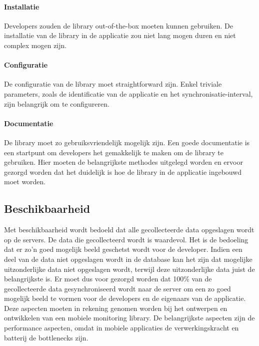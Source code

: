 \paragraph{Installatie} Developers zouden de library out-of-the-box moeten kunnen gebruiken. De installatie van de library in de applicatie zou niet lang mogen duren en niet complex mogen zijn. \\

\paragraph{Configuratie} De configuratie van de library moet straightforward zijn. Enkel triviale parameters, zoals de identificatie van de applicatie en het synchronisatie-interval, zijn belangrijk om te configureren. \\

\paragraph{Documentatie} De library moet zo gebruiksvriendelijk mogelijk zijn. Een goede documentatie is een startpunt om developers het gemakkelijk te maken om de library te gebruiken. Hier moeten de belangrijkste methodes uitgelegd worden en ervoor gezorgd worden dat het duidelijk is hoe de library in de applicatie ingebouwd moet worden. 



\subsection{Beschikbaarheid}
Met beschikbaarheid wordt bedoeld dat alle gecollecteerde data opgeslagen wordt op de servers. De data die gecollecteerd wordt is waardevol. Het is de bedoeling dat er zo'n goed mogelijk beeld geschetst wordt voor de developer. Indien een deel van de data niet opgeslagen wordt in de database kan het zijn dat mogelijke uitzonderlijke data niet opgeslagen wordt, terwijl deze uitzonderlijke data juist de belangrijkste is. Er moet dus voor gezorgd worden dat 100\% van de gecollecteerde data gesynchroniseerd wordt naar de server om een zo goed mogelijk beeld te vormen voor de developers en de eigenaars van de applicatie.\\


Deze aspecten moeten in rekening genomen worden bij het ontwerpen en ontwikkelen van een mobiele monitoring library. De belangrijkste aspecten zijn de performance aspecten, omdat in mobiele applicaties de verwerkingskracht en batterij de bottlenecks zijn. 

